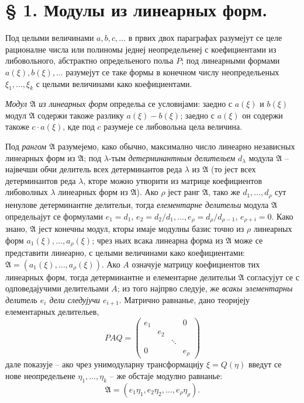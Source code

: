 \documentclass[11pt]{article}
\providecommand{\Amod}{\mathfrak A}
\begin{document}
\section*{§ 1. Модулы из линеарных форм.}

Под целыми величинами $a,b,c,\ldots$ в првих двох параграфах разумејут се целе рационалне числа или полиномы једнеј неопредельенеј с коефициентами из либовольного, абстрактно определьеного польа $P$; под линеарными формами $a(\xi),b(\xi),\ldots$ разумејут се таке формы в конечном числу неопредельеных $\xi_1,\ldots,\xi_k$ с целыми величинами како коефициентами.

\emph{Модул $\Amod$ из линеарных форм} определьа се условијами: заедно с $a(\xi)$ и $b(\xi)$ модул $\Amod$ содержи такоже разлику $a(\xi)-b(\xi)$; заедно с $a(\xi)$ он содержи такоже $c\cdot a(\xi)$, кде под $c$ разумеје се либовольна цела величина.

Под \emph{рангом $\Amod$} разумејемо, како обычно, максимално число линеарно независных линеарных форм из $\Amod$; под $\lambda$-тым \emph{детерминантным делительем} $d_\lambda$ модула $\Amod$ -- највечши обчи делитель всех детерминантов реда $\lambda$ из $\Amod$ (то јест всех детерминантов реда $\lambda$, кторе можно утворити из матрице коефициентов либоволных $\lambda$ линеарных форм из $\Amod$). Ако $\rho$ јест ранг $\Amod$, тако же $d_1,\ldots,d_\rho$ сут ненулове детерминантне делительи, тогда \emph{елементарне делительи} модула $\Amod$ определьајут се формулами $e_1=d_1$, $e_2=d_2/d_1,\ldots,e_\rho=d_\rho/d_{\rho-1}$, $e_{\rho+i}=0$. Како знано, $\Amod$ јест конечны модул, кторы имаје модулны базис точно из $\rho$ линеарных форм $a_1(\xi),\ldots,a_\rho(\xi)$; чрез ньих всака линеарна форма из $\Amod$ може се представити линеарно, с целыми величинами како коефициентами:
$\Amod=(a_1(\xi),\ldots,a_\rho(\xi))$. Ако $A$ означује матрицу коефициентов тих линеарных форм, тогда детерминантне и елементарне делительи $\Amod$ согласујут се с одповедајучими делительами $A$; из того најпрво следује, же \emph{всакы элементарны делитель $e_i$ дели следујучи $e_{i+1}$}. Матрично равнанье, дано теоријеју елементарных делительев,
\[
 P A Q=\begin{pmatrix}
 e_1&&&0\\
 &e_2&&\\
 &&\ddots&\\
 0&&&e_\rho
 \end{pmatrix}
\]
дале показује -- ако чрез унимодуларну трансформацију $\xi=Q(\eta)$ введут се нове неопредельене $\eta_1,\ldots,\eta_k$ -- же обстаје модулно равнанье:
\begin{equation}
 \Amod=(e_1\eta_1,e_2\eta_2,\ldots,e_\rho\eta_\rho).
\tag{1}
\end{equation}
\end{document}
